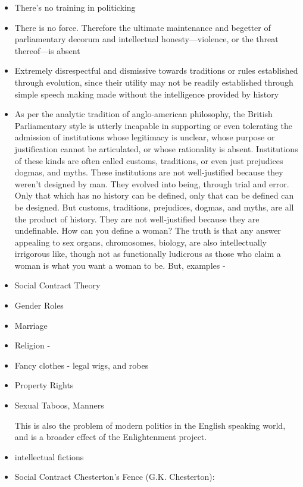 \begin{itemize}
        \item There's no training in politicking
        \item There is no force. Therefore the ultimate maintenance and begetter of parliamentary decorum and intellectual honesty—violence, or the threat thereof—is absent
        \item Extremely disrespectful and dismissive towards traditions or rules established through evolution, since their utility may not be readily established through simple speech making made without the intelligence provided by history 
        \item As per the analytic tradition of anglo-american philosophy, the British Parliamentary style is utterly incapable in supporting or even tolerating the admission of institutions whose legitimacy is unclear, whose purpose or justification cannot be articulated, or whose rationality is absent. Institutions of these kinds are often called customs, traditions, or even just prejudices dogmas, and myths. These institutions are not well-justified because they weren't designed by man. They evolved into being, through trial and error. Only that which has no history can be defined, only that can be defined can be designed. But customs, traditions, prejudices, dogmas, and myths, are all the product of history. They are not well-justified because they are undefinable. How can you define a woman? The truth is that any answer appealing to sex organs, chromosomes, biology, are also intellectually irrigorous like, though not as functionally ludicrous as those who claim a woman is what you want a woman to be. But, examples - 
        \item Social Contract Theory 
        \item Gender Roles 
        \item Marriage
        \item Religion -
        \item Fancy clothes - legal wigs, and robes 
        \item Property Rights 
        \item Sexual Taboos, Manners
        
        This is also the problem of modern politics in the English speaking world, and is a broader effect of the Enlightenment project.
        \item intellectual fictions 
        \item Social Contract 
        Chesterton’s Fence (G.K. Chesterton):
    
\end{itemize}



